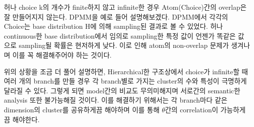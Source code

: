\documentclass[a4paper]{oblivoir}
\begin{document}
허나 choice k의 개수가 finite하지 않고 infinite한 경우 Atom(Choice)간의 overlap은 잘 만들어지지 않는다. DPMM을 예로 들어 설명해보겠다. DPMM에서 각각의 Choice는 base distribution H에 의해 sampling된 결과로 볼 수 있었다. 허나 continuous한 base distribution에서 임의로 sampling한 특정 값이 언젠가 똑같은 값으로 sampling될 확률은 현저하게 낮다. 이로 인해 atom의 non-overlap 문제가 생겨나며 이를 꼭 해결해주어야 하는 것이다. 

위의 상황을 조금 더 풀어 설명하면, Hierarchical한 구조상에서 choice가 infinite할 때 여러 개의  branch를 만들 경우 각 branch별로 가지는 cluster의 수와 특성이 극명하게 달라질 수 있다. 그렇게 되면 model간의 비교도 무의미해지며 서로간의 semantic한 analysis 또한 불가능해질 것이다. 이를 해결하기 위해서는 각 branch마다 같은 dimension의 cluster를 공유하게끔 해야하며 이를 통해 $\theta$간의 correlation이 가능하게끔 해야한다. 
\end{document}
